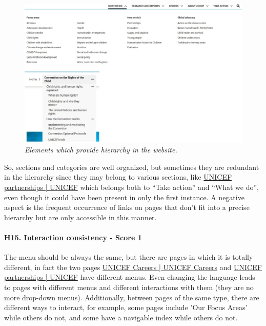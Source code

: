 \begin{figure}[!h]
	\begin{center}
		\includegraphics[width=\textwidth]{FinalScores18.jpg}
		\captionsetup{font=small}
		\caption{\textit{Elements which provide hierarchy in the website.}}
	\end{center}
\end{figure}
\newline
So, sections and categories are well organized, but sometimes they are redundant in the hierarchy since they may belong to various sections, like \href{https://www.unicef.org/partnerships}{UNICEF partnerships | UNICEF} which belongs both to “Take action” and “What we do”, even though it could have been present in only the first instance. 
\newline A negative aspect is the frequent occurrence of links on pages that don't fit into a precise hierarchy but are only accessible in this manner.
\newline
\newline \paragraph{H15. Interaction consistency - Score 1}	\label{subsec:H15}The menu should be always the same, but there are pages in which it is totally different, in fact the two pages \href{https://www.unicef.org/careers/}{UNICEF Careers | UNICEF Careers} and \href{https://www.unicef.org/partnerships}{UNICEF partnerships | UNICEF} have different menus. Even changing the language leads to pages with different menus and different interactions with them (they are no more drop-down menus).
\newline Additionally, between pages of the same type, there are different ways to interact, for example, some pages include 'Our Focus Areas' while others do not, and some have a navigable index while others do not.
